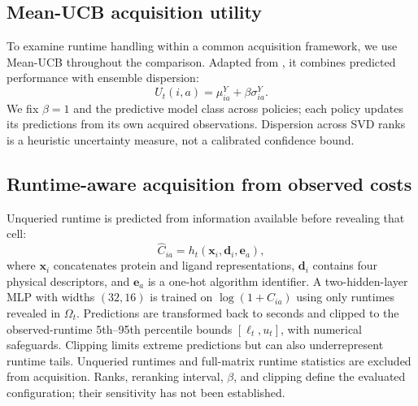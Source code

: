 \documentclass{article}
\begin{document}
\subsection{Mean-UCB acquisition utility}
To examine runtime handling within a common acquisition framework, we use Mean-UCB throughout the comparison. Adapted from \citet{qin2025active}, it combines predicted performance with ensemble dispersion:
\begin{equation}
U_t(i,a)=\mu^Y_{ia}+\beta\sigma^Y_{ia}.
\end{equation}
We fix $\beta=1$ and the predictive model class across policies; each policy updates its predictions from its own acquired observations. Dispersion across SVD ranks is a heuristic uncertainty measure, not a calibrated confidence bound.

\subsection{Runtime-aware acquisition from observed costs}
Unqueried runtime is predicted from information available before revealing that cell:
\begin{equation}
\widehat C_{ia}=h_t(\mathbf x_i,\mathbf d_i,\mathbf e_a),
\end{equation}
where $\mathbf x_i$ concatenates protein and ligand representations, $\mathbf d_i$ contains four physical descriptors, and $\mathbf e_a$ is a one-hot algorithm identifier. A two-hidden-layer MLP with widths $(32,16)$ is trained on $\log(1+C_{ia})$ using only runtimes revealed in $\Omega_t$. Predictions are transformed back to seconds and clipped to the observed-runtime 5th--95th percentile bounds $[\ell_t,u_t]$, with numerical safeguards. Clipping limits extreme predictions but can also underrepresent runtime tails. Unqueried runtimes and full-matrix runtime statistics are excluded from acquisition. Ranks, reranking interval, $\beta$, and clipping define the evaluated configuration; their sensitivity has not been established.
\end{document}
